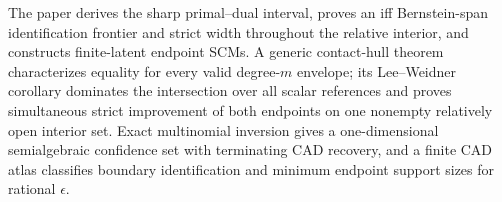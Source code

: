 The paper derives the sharp primal--dual interval, proves an iff Bernstein-span identification frontier and strict width throughout the relative interior, and constructs finite-latent endpoint SCMs. A generic contact-hull theorem characterizes equality for every valid degree-\(m\) envelope; its Lee--Weidner corollary dominates the intersection over all scalar references and proves simultaneous strict improvement of both endpoints on one nonempty relatively open interior set. Exact multinomial inversion gives a one-dimensional semialgebraic confidence set with terminating CAD recovery, and a finite CAD atlas classifies boundary identification and minimum endpoint support sizes for rational \(\epsilon\).